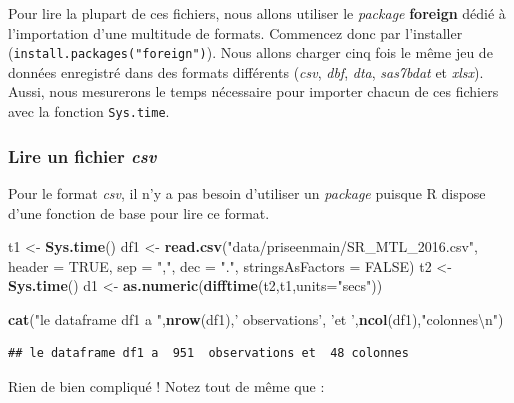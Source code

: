\documentclass[
  11pt,
  french,
]{book}
\makeatletter
\newenvironment{Shaded}{\begin{snugshade}}{\end{snugshade}}
\newcommand{\CharTok}[1]{\textcolor[rgb]{0.31,0.60,0.02}{#1}}
\newcommand{\DataTypeTok}[1]{\textcolor[rgb]{0.13,0.29,0.53}{#1}}
\newcommand{\KeywordTok}[1]{\textcolor[rgb]{0.13,0.29,0.53}{\textbf{#1}}}
\newcommand{\NormalTok}[1]{#1}
\newcommand{\OtherTok}[1]{\textcolor[rgb]{0.56,0.35,0.01}{#1}}
\newcommand{\StringTok}[1]{\textcolor[rgb]{0.31,0.60,0.02}{#1}}
\newenvironment{kframe}{%
\medskip{}
\setlength{\fboxsep}{.8em}
 \def\at@end@of@kframe{}%
 \ifinner\ifhmode%
  \def\at@end@of@kframe{\end{minipage}}%
  \begin{minipage}{\columnwidth}%
 \fi\fi%
 \def\FrameCommand##1{\hskip\@totalleftmargin \hskip-\fboxsep
 \colorbox{shadecolor}{##1}\hskip-\fboxsep
     \hskip-\linewidth \hskip-\@totalleftmargin \hskip\columnwidth}%
 \MakeFramed {\advance\hsize-\width
   \@totalleftmargin\z@ \linewidth\hsize
   \@setminipage}}%
 {\par\unskip\endMakeFramed%
 \at@end@of@kframe}
\renewenvironment{Shaded}{\begin{kframe}}{\end{kframe}}
\makeatother
\begin{document}
Pour lire la plupart de ces fichiers, nous allons utiliser le \emph{package} \textbf{foreign} dédié à l'importation d'une multitude de formats. Commencez donc par l'installer (\texttt{install.packages("foreign")}). Nous allons charger cinq fois le même jeu de données enregistré dans des formats différents (\emph{csv}, \emph{dbf}, \emph{dta}, \emph{sas7bdat} et \emph{xlsx}). Aussi, nous mesurerons le temps nécessaire pour importer chacun de ces fichiers avec la fonction \texttt{Sys.time}.

\hypertarget{sect01411}{%
\subsubsection{\texorpdfstring{Lire un fichier \emph{csv}}{Lire un fichier csv}}\label{sect01411}}

Pour le format \emph{csv}, il n'y a pas besoin d'utiliser un \emph{package} puisque R dispose d'une fonction de base pour lire ce format.

\begin{Shaded}
\begin{Highlighting}[]
\NormalTok{t1 <-}\StringTok{ }\KeywordTok{Sys.time}\NormalTok{()}
\NormalTok{df1 <-}\StringTok{ }\KeywordTok{read.csv}\NormalTok{(}\StringTok{"data/priseenmain/SR_MTL_2016.csv"}\NormalTok{, }
         \DataTypeTok{header =} \OtherTok{TRUE}\NormalTok{, }\DataTypeTok{sep =} \StringTok{","}\NormalTok{, }\DataTypeTok{dec =} \StringTok{"."}\NormalTok{,}
         \DataTypeTok{stringsAsFactors =} \OtherTok{FALSE}\NormalTok{)}
\NormalTok{t2 <-}\StringTok{ }\KeywordTok{Sys.time}\NormalTok{()}
\NormalTok{d1 <-}\StringTok{ }\KeywordTok{as.numeric}\NormalTok{(}\KeywordTok{difftime}\NormalTok{(t2,t1,}\DataTypeTok{units=}\StringTok{"secs"}\NormalTok{))}

\KeywordTok{cat}\NormalTok{(}\StringTok{"le dataframe df1 a "}\NormalTok{,}\KeywordTok{nrow}\NormalTok{(df1),}\StringTok{' observations'}\NormalTok{,}
    \StringTok{'et '}\NormalTok{,}\KeywordTok{ncol}\NormalTok{(df1),}\StringTok{"colonnes}\CharTok{\textbackslash{}n}\StringTok{"}\NormalTok{)}
\end{Highlighting}
\end{Shaded}

\begin{verbatim}
## le dataframe df1 a  951  observations et  48 colonnes
\end{verbatim}

Rien de bien compliqué ! Notez tout de même que :
\end{document}
